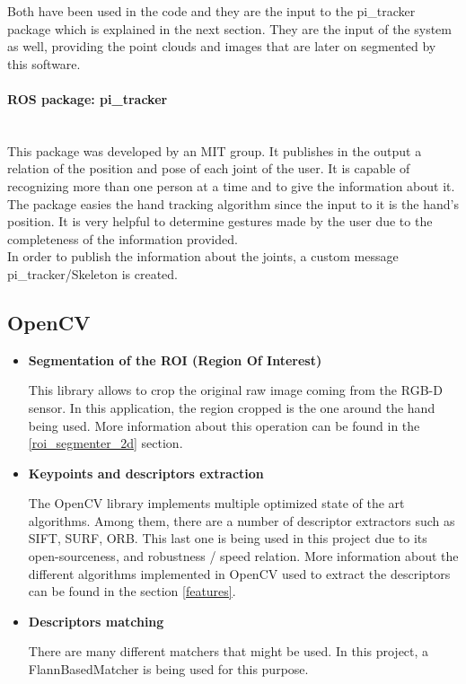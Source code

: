 		Both have been used in the code and they are the input to the pi\_tracker package which is explained in the next section. They are the input of the system as well, providing the point clouds and images that are later on segmented by this software. 


		\paragraph{ROS package: pi\_tracker}\mbox{} \\

		This package was developed by an MIT group. It publishes in the output a relation of the position and pose of each joint of the user. It is capable of recognizing more than one person at a time and to give the information about it. 
		\\

		The package easies the hand tracking algorithm since the input to it is the hand's position. It is very helpful to determine gestures made by the user due to the completeness of the information provided. 
		\\

		In order to publish the information about the joints, a custom message pi\_tracker/Skeleton is created. 

	\subsection{OpenCV}
		\label{technologies_opencv}
		\begin{itemize}
		\item\textbf{Segmentation of the ROI (Region Of Interest)\\ }

		This library allows to crop the original raw image coming
		from the RGB-D sensor. In this application, the region cropped is the one around the hand being used. More information about this operation can be found in the \ref{roi_segmenter_2d} section. 
		

		\item\textbf{ {Keypoints and descriptors extraction\\ }}

		 The OpenCV library implements multiple optimized state of the art algorithms. Among them, there are a number of descriptor extractors such as SIFT, SURF, ORB. This last one is being used in this project due to its open-sourceness, and robustness / speed relation. More information about the different algorithms implemented in OpenCV used to extract the descriptors can be found in the section \ref{features}.


		\item\textbf{ {Descriptors matching\\ } }

		There are many different matchers that might be used. In this project, a FlannBasedMatcher
		is being used for this purpose. 
		\end{itemize}


